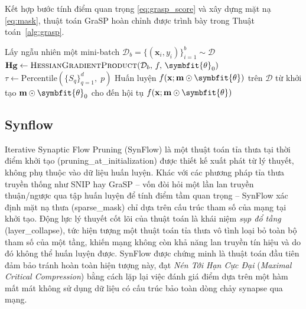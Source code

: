 Kết hợp bước tính điểm quan trọng \eqref{eq:grasp_score} và xây dựng
mặt nạ \eqref{eq:mask}, thuật toán GraSP hoàn chỉnh được trình bày trong
Thuật toán~\ref{alg:grasp}.

\begin{algorithm}[H]
    \caption{Bảo toàn tín hiệu gradient (GraSP)}
    \label{alg:grasp}
    \DontPrintSemicolon
    \SetAlgoLined
    \BlankLine
    Lấy ngẫu nhiên một mini-batch
    $\mathcal{D}_b = \{(\mathbf{x}_i, y_i)\}_{i=1}^{b} \sim \mathcal{D}$\;
    \BlankLine
    $\mathbf{Hg} \leftarrow \textsc{HessianGradientProduct}(\mathcal{D}_b,\,f,\,\symbfit{\theta}_0)$\;
    \BlankLine
    \BlankLine
    $\tau \leftarrow \mathrm{Percentile}\!\left(\{S_q\}_{q=1}^{d},\; p\right)$\;
    \BlankLine
    \BlankLine
    Huấn luyện $f(\mathbf{x};\mathbf{m}\odot\symbfit{\theta})$ trên $\mathcal{D}$
    từ khởi tạo $\mathbf{m}\odot\symbfit{\theta}_0$ cho đến hội tụ\;
    \BlankLine
    \Return $f(\mathbf{x};\mathbf{m}\odot\symbfit{\theta})$\;
\end{algorithm}

\subsection{Synflow}
Iterative Synaptic Flow Pruning (SynFlow) \cite{synflow} là một thuật
toán tỉa thưa tại thời điểm khởi tạo (\gls{pruning_at_initialization}) được
thiết kế xuất phát từ lý thuyết, không phụ thuộc vào dữ liệu huấn luyện.
Khác với các phương pháp tỉa thưa truyền thống như SNIP hay
GraSP -- vốn đòi hỏi một lần lan truyền thuận/ngược qua
tập huấn luyện để tính điểm tầm quan trọng -- SynFlow xác định mặt nạ thưa
(\gls{sparse_mask}) chỉ dựa trên cấu trúc tham số của mạng tại khởi tạo.
Động lực lý thuyết cốt lõi của thuật toán là khái niệm \emph{sụp đổ tầng}
(\gls{layer_collapse}), tức hiện tượng một thuật toán tỉa thưa vô tình loại bỏ
toàn bộ tham số của một tầng, khiến mạng không còn khả năng lan truyền tín hiệu
và do đó không thể huấn luyện được. SynFlow được chứng minh là thuật toán đầu
tiên đảm bảo tránh hoàn toàn hiện tượng này, đạt \emph{Nén Tới Hạn Cực Đại}
(\emph{Maximal Critical Compression}) bằng cách lặp lại việc đánh giá điểm
dựa trên một hàm mất mát không sử dụng dữ liệu có cấu trúc bảo toàn dòng chảy
synapse qua mạng.

